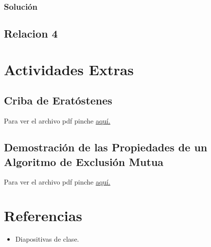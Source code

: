 \documentclass[a4paper,12pt]{article}
\begin{document}
\subsubsection{Solución}






\subsection{Relacion 4}


\section{Actividades Extras}
\subsection{Criba de Eratóstenes}
%
Para ver el archivo pdf pinche 
\href{https://github.com/ElblogdeIsmael/ElblogdeIsmael.github.io/blob/main/Asignaturas/Tercer%20A%C3%B1o/SCD/Teoria/Actividad_Extra/cribadeErastotenes/ETSIIT/build/Erastotenes.pdf}{aquí.}

\subsection{Demostración de las Propiedades de un Algoritmo de Exclusión Mutua}
Para ver el archivo pdf pinche 
\href{https://github.com/ElblogdeIsmael/ElblogdeIsmael.github.io/blob/main/Asignaturas/Tercer%20A%C3%B1o/SCD/Teoria/Actividad_Extra/Demostracion_Prop_ALG_EM/ETSIIT/build/Demostracion.pdf}{aquí.}

\newpage

\section{Referencias}
\begin{itemize}
    \item Diapositivas de clase.
\end{itemize}
\end{document}
